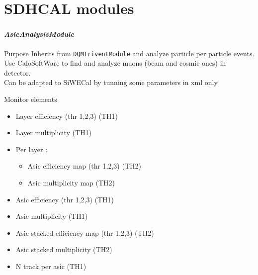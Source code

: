 \documentclass[8pt]{beamer}
\begin{document}
  \section{SDHCAL modules}
  
  
  
  \begin{frame}[containsverbatim]
    \frametitle{\secname}
    \framesubtitle{\textit{AsicAnalysisModule}}
    \begin{block}{Purpose}
      Inherits from \verb|DQMTriventModule| and analyze particle per particle events. \\
      Use CaloSoftWare to find and analyze muons (beam and cosmic ones) in detector. \\
      Can be adapted to SiWECal by tunning some parameters in xml only
    \end{block}
    
    \begin{block}{Monitor elements}
      \begin{itemize}
        \item Layer efficiency (thr 1,2,3) (TH1)
        \item Layer multiplicity (TH1)
        \item Per layer :
        \begin{itemize}
          \item Asic efficiency map (thr 1,2,3) (TH2)
          \item Asic multiplicity map (TH2)
        \end{itemize}
        \item Asic efficiency (thr 1,2,3) (TH1)
        \item Asic multiplicity (TH1)
        \item Asic stacked efficiency map (thr 1,2,3) (TH2)
        \item Asic stacked multiplicity (TH2)
        \item N track per asic (TH1)
      \end{itemize}      
    \end{block}
  \end{frame}
  
  
  
\end{document}
